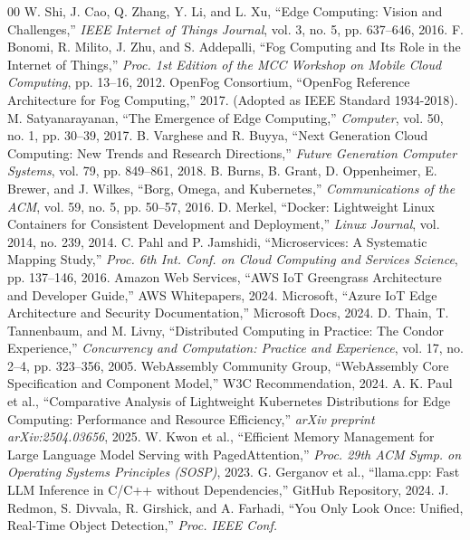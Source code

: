 \documentclass[conference]{IEEEtran}
\begin{document}
    \begin{thebibliography}{00}
     W. Shi, J. Cao, Q. Zhang, Y. Li, and L. Xu, ``Edge Computing: Vision and Challenges,'' \textit{IEEE Internet of Things Journal}, vol. 3, no. 5,
    pp. 637--646, 2016.
     F. Bonomi, R. Milito, J. Zhu, and S. Addepalli, ``Fog Computing and Its Role in the Internet of Things,'' \textit{Proc. 1st Edition of the MCC
    Workshop on Mobile Cloud Computing}, pp. 13--16, 2012.
     OpenFog Consortium, ``OpenFog Reference Architecture for Fog Computing,'' 2017. (Adopted as IEEE Standard 1934-2018).
     M. Satyanarayanan, ``The Emergence of Edge Computing,'' \textit{Computer}, vol. 50, no. 1, pp. 30--39, 2017.
     B. Varghese and R. Buyya, ``Next Generation Cloud Computing: New Trends and Research Directions,'' \textit{Future Generation Computer Systems},
    vol. 79, pp. 849--861, 2018.
     B. Burns, B. Grant, D. Oppenheimer, E. Brewer, and J. Wilkes, ``Borg, Omega, and Kubernetes,'' \textit{Communications of the ACM}, vol. 59, no. 5,
    pp. 50--57, 2016.
     D. Merkel, ``Docker: Lightweight Linux Containers for Consistent Development and Deployment,'' \textit{Linux Journal}, vol. 2014, no. 239, 2014.
     C. Pahl and P. Jamshidi, ``Microservices: A Systematic Mapping Study,'' \textit{Proc. 6th Int. Conf. on Cloud Computing and Services Science}, pp.
    137--146, 2016.
     Amazon Web Services, ``AWS IoT Greengrass Architecture and Developer Guide,'' AWS Whitepapers, 2024.
     Microsoft, ``Azure IoT Edge Architecture and Security Documentation,'' Microsoft Docs, 2024.
     D. Thain, T. Tannenbaum, and M. Livny, ``Distributed Computing in Practice: The Condor Experience,'' \textit{Concurrency and Computation:
    Practice and Experience}, vol. 17, no. 2--4, pp. 323--356, 2005.
     WebAssembly Community Group, ``WebAssembly Core Specification and Component Model,'' W3C Recommendation, 2024.
     A. K. Paul et al., ``Comparative Analysis of Lightweight Kubernetes Distributions for Edge Computing: Performance and Resource Efficiency,''
    \textit{arXiv preprint arXiv:2504.03656}, 2025.
     W. Kwon et al., ``Efficient Memory Management for Large Language Model Serving with PagedAttention,'' \textit{Proc. 29th ACM Symp. on Operating
    Systems Principles (SOSP)}, 2023.
     G. Gerganov et al., ``llama.cpp: Fast LLM Inference in C/C++ without Dependencies,'' GitHub Repository, 2024.
     J. Redmon, S. Divvala, R. Girshick, and A. Farhadi, ``You Only Look Once: Unified, Real-Time Object Detection,'' \textit{Proc. IEEE Conf.
}
\end{thebibliography}
\end{document}
